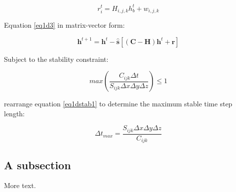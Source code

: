\documentclass[11pt]{article} %
\begin{document}
\begin{equation} \label{eq1d4}
r^{t}_{i} = H_{i,j,k} h^{t}_{b} + w_{i,j,k} 
\end{equation}


Equation \ref{eq1d3} in matrix-vector form:

\begin{equation} \label{eq1dvec}
\mathbf{h}^{t+1} = \mathbf{h}^t - \hat{\mathbf{s}} \left[ \left ( \mathbf{C} - \mathbf{H} \right ) \mathbf{h}^{t} + \mathbf{r} \right] 
\end{equation}

\noindent Subject to the stability constraint:

\begin{equation} \label{eq1dstab1}
max \left( \frac{C_{ijk} \Delta t}{S_{ijk} \Delta x \Delta y \Delta z} \right) \le 1 
\end{equation}

\noindent rearrange equation \ref{eq1dstab1} to determine the maximum stable time step length:

\begin{equation} \label{eq1dstab2}
\Delta t_{max} = \frac{S_{ijk} \Delta x \Delta y \Delta z}{C_{ijk} } 
\end{equation}

\subsection{A subsection}

More text.
\end{document}
